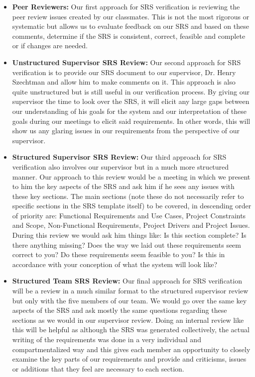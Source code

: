 \documentclass[12pt, titlepage]{article}
\begin{document}
\begin{itemize}

  \item{\textbf{Peer Reviewers:} Our first approach for SRS verification is reviewing the peer review issues created by our classmates. This
  is not the most rigorous or systematic but allows us to evaluate feedback on our SRS and based on these comments, determine if the SRS is consistent,
  correct, feasible and complete or if changes are needed.}
  \item{\textbf{ Unstructured Supervisor SRS Review:} Our second approach for SRS verification is to provide our SRS document to our supervisor, Dr. Henry Szechtman and
  allow him to make comments on it. This approach is also quite unstructured but is still useful in our verification process. By giving our supervisor
  the time to look over the SRS, it will elicit any large gaps between our understanding of his goals for the system and our interpretation of these goals
  during our meetings to elicit said requirements. In other words, this will show us any glaring issues in our requirements from the perspective of our
  supervisor.}
  \item{\textbf{Structured Supervisor SRS Review:} Our third approach for SRS verification also involves our supervisor but in a much more structured manner.
  Our approach to this review would be a meeting in which we present to him the key aspects of the SRS and ask him if he sees any issues with these key sections.
  The main sections (note these do not necessarily refer to specific sections in the SRS template itself) to be covered, in descending order of priority are: Functional Requirements and Use Cases, Project Constraints and Scope, Non-Functional Requirements, Project
  Drivers and Project Issues. During this review we would ask him things like: Is this section complete? Is there anything missing? Does the way we laid out
  these requirements seem correct to you? Do these requirements seem feasible to you? Is this in accordance with your conception of what the system will look like?}
  \item{\textbf{Structured Team SRS Review:} Our final approach for SRS verification will be a review in a much similar format to the structured supervisor
  review but only with the five members of our team. We would go over the same key aspects of the SRS and ask mostly the same questions regarding these sections
  as we would in our supervisor review. Doing an internal review like this will be helpful as although the SRS was generated collectively, the actual writing
  of the requirements was done in a very individual and compartmentalized way and this gives each member an opportunity to closely examine the key parts of our
  requirements and provide and criticisms, issues or additions that they feel are necessary to each section.}
\end{itemize}
\end{document}
